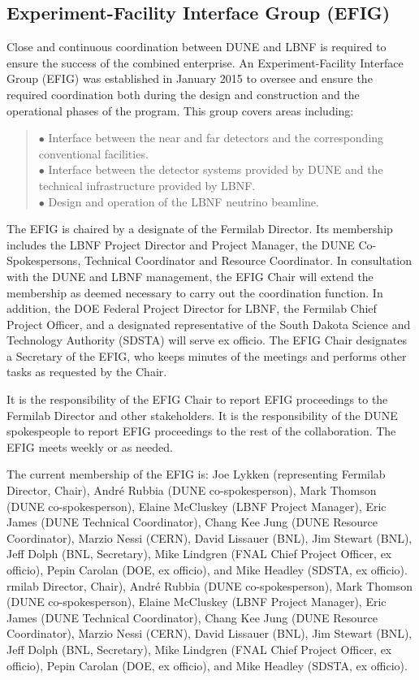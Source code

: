 \subsection{Experiment-Facility Interface Group (EFIG)}

Close and continuous coordination between DUNE and LBNF is
required to ensure the success of the combined enterprise.
An Experiment-Facility Interface Group (EFIG) was established
in January 2015 to oversee and ensure the required coordination
both during the design and construction and the operational
phases of the program. This group covers areas including:
\begin{quote}
$\bullet$ Interface between the near and far detectors and the
corresponding conventional facilities.\\
$\bullet$ Interface between the detector systems provided by
DUNE and the technical infrastructure provided by LBNF.\\
$\bullet$ Design and operation of the LBNF neutrino beamline.
\end{quote}

The EFIG is chaired by a designate of the Fermilab Director.
Its membership includes the LBNF Project Director and Project Manager,
the DUNE Co-Spokespersons, Technical Coordinator and Resource Coordinator.
In consultation with the DUNE and LBNF management, the EFIG Chair will
extend the membership as deemed necessary to carry out the coordination
function. In addition, the DOE Federal Project Director for LBNF,
the Fermilab Chief Project Officer, and a designated representative
of the South Dakota Science and Technology Authority (SDSTA) will
serve ex officio. The EFIG Chair designates a Secretary of the EFIG,
who keeps minutes of the meetings and performs other tasks as
requested by the Chair.

It is the responsibility of the EFIG Chair to report EFIG proceedings
to the Fermilab Director and other stakeholders. It is the responsibility
of the DUNE spokespeople to report EFIG proceedings to the rest of
the collaboration. The EFIG meets weekly or as needed.

The current membership of the EFIG is:
Joe Lykken (representing Fermilab Director, Chair),
André Rubbia (DUNE co-spokesperson),
Mark Thomson (DUNE co-spokesperson),
Elaine McCluskey (LBNF Project Manager),
Eric James (DUNE Technical Coordinator),
Chang Kee Jung (DUNE Resource Coordinator),
Marzio Nessi (CERN),
David Lissauer (BNL),
Jim Stewart (BNL),
Jeff Dolph (BNL, Secretary),
Mike Lindgren (FNAL Chief Project Officer, ex officio),
Pepin Carolan (DOE, ex officio), and 
Mike Headley (SDSTA, ex officio).
rmilab Director, Chair),
André Rubbia (DUNE co-spokesperson),
Mark Thomson (DUNE co-spokesperson),
Elaine McCluskey (LBNF Project Manager),
Eric James (DUNE Technical Coordinator),
Chang Kee Jung (DUNE Resource Coordinator),
Marzio Nessi (CERN),
David Lissauer (BNL),
Jim Stewart (BNL),
Jeff Dolph (BNL, Secretary),
Mike Lindgren (FNAL Chief Project Officer, ex officio),
Pepin Carolan (DOE, ex officio), and 
Mike Headley (SDSTA, ex officio).

	
